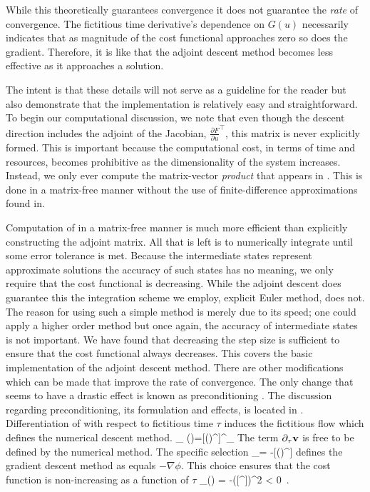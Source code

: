 
While this theoretically guarantees convergence it does not guarantee the \textit{rate} of
convergence. The fictitious time derivative's dependence on $G(u)$ necessarily
indicates that as magnitude of the cost functional approaches zero so does the gradient.
Therefore, it is like that the adjoint descent method becomes less effective as it approaches a solution.

The intent is that these details will not serve as a guideline
for the reader but also demonstrate that the implementation is relatively easy and
straightforward. To begin our computational discussion, we note that even though
the descent direction includes the adjoint of the Jacobian, $\frac{\partial F}{\partial u}^{\top}$, this
matrix is never explicitly formed. This is important because the computational
cost, in terms of time and resources, becomes prohibitive as the dimensionality of
the system increases. Instead, we only ever compute the matrix-vector \textit{product}
that appears in . This is done in a matrix-free manner without
the use of finite-difference approximations found in.

Computation of  in a matrix-free manner
is much more efficient than explicitly constructing the adjoint matrix.
All that is left is to numerically integrate  until
some error tolerance is met.
Because the intermediate states represent
approximate solutions the accuracy of such states has no meaning, we only
require that the cost functional  is decreasing.
While the adjoint descent does guarantee this
the integration scheme we employ, explicit Euler method, does not. The reason
for using such a simple method is merely due to its speed; one could apply a higher
order method but once again, the accuracy of intermediate states is not important.
We have found that decreasing the step size
is sufficient to ensure that the cost functional always decreases.
This covers the basic implementation of the adjoint descent method. There
are other modifications which can be made that improve the rate of convergence.
The only change that seems to have a drastic effect is known as preconditioning .
The discussion regarding preconditioning, its
formulation and effects, is located in .
Differentiation of  with respect to fictitious time $\tau$ induces
the fictitious flow which defines the numerical descent method.
\beq \label{e-fictitiousflow}
\partial_{\tau} \phi(\statev)=[(\nabla\goveqn)^{\top}\goveqn]^{\top}\partial_{\tau}\statev
\eeq
The term $\partial_{\tau}\mathbf{v}$ is free to be defined by the numerical method. The specific selection
\beq \label{e-descent}
\partial_{\tau}\statev = -[(\nabla\goveqn)^{\top}]\goveqn
\eeq
defines the gradient descent method as  equals $-\nabla \phi$.
This choice ensures that the cost function is non-increasing as a function of $\tau$
\beq \label{e-adjointdescent}
\partial_{\tau}\phi(\statev) = -([\nabla^{\top}\goveqn]\goveqn)^2 < 0 \,.
\eeq


